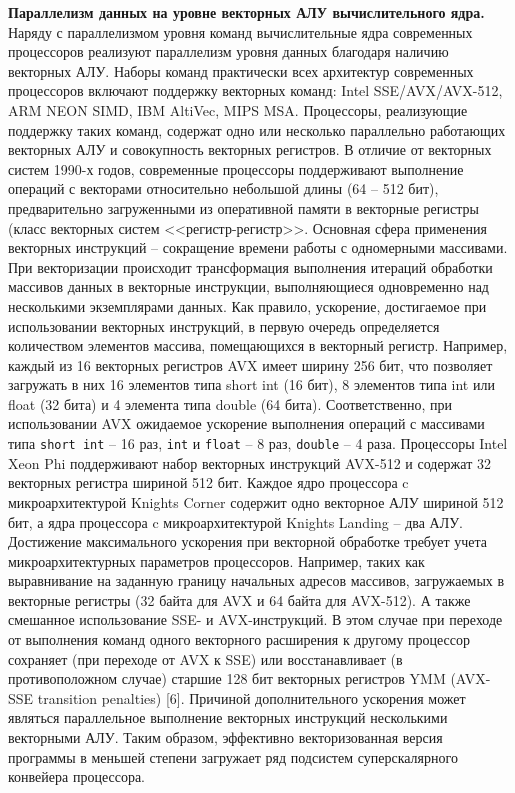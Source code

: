 \textbf{Параллелизм данных на уровне векторных АЛУ вычислительного ядра.}
Наряду с параллелизмом уровня команд вычислительные ядра современных процессоров реализуют параллелизм уровня данных благодаря наличию векторных АЛУ. Наборы команд практически всех архитектур современных процессоров включают поддержку векторных команд: Intel SSE/AVX/AVX-512, ARM NEON SIMD, IBM AltiVec, MIPS MSA. Процессоры, реализующие поддержку таких команд, содержат одно или несколько параллельно работающих векторных АЛУ и совокупность векторных регистров. В отличие от векторных систем 1990-х годов, современные процессоры поддерживают выполнение операций с векторами относительно небольшой длины (64 -- 512 бит), предварительно загруженными из оперативной памяти в векторные регистры (класс векторных систем <<регистр-регистр>>. 
Основная сфера применения векторных инструкций -- сокращение времени работы с одномерными массивами. При векторизации происходит трансформация выполнения итераций обработки массивов данных в векторные инструкции, выполняющиеся одновременно над несколькими экземплярами данных. Как правило, ускорение, достигаемое при использовании векторных инструкций, в первую очередь определяется количеством элементов массива, помещающихся в векторный регистр. Например, каждый из 16 векторных регистров AVX имеет ширину 256 бит, что позволяет загружать в них 16 элементов типа short int (16 бит), 8 элементов типа int или float (32 бита) и 4 элемента типа double (64 бита). Соответственно, при использовании AVX ожидаемое ускорение выполнения операций с массивами типа \texttt{short int} -- 16 раз, \texttt{int} и \texttt{float} -- 8 раз, \texttt{double} -- 4 раза.
Процессоры Intel Xeon Phi поддерживают набор векторных инструкций AVX-512 и содержат 32 векторных регистра шириной 512 бит. Каждое ядро процессора c микроархитектурой Knights Corner содержит одно векторное АЛУ шириной 512 бит, а ядра процессора c микроархитектурой Knights Landing -- два АЛУ. 
Достижение максимального ускорения при векторной обработке требует учета микроархитектурных параметров процессоров. Например, таких как выравнивание на заданную границу начальных адресов массивов, загружаемых в векторные регистры (32 байта для AVX и 64 байта для AVX-512). А также смешанное использование SSE- и AVX-инструкций. В этом случае при переходе от выполнения команд одного векторного расширения к другому процессор сохраняет (при переходе от AVX к SSE) или восстанавливает (в противоположном случае) старшие 128 бит векторных регистров YMM (AVX-SSE transition penalties) [6].
Причиной дополнительного ускорения может являться параллельное выполнение векторных инструкций несколькими векторными АЛУ. Таким образом, эффективно векторизованная версия программы в меньшей степени загружает ряд подсистем суперскалярного конвейера процессора. 
